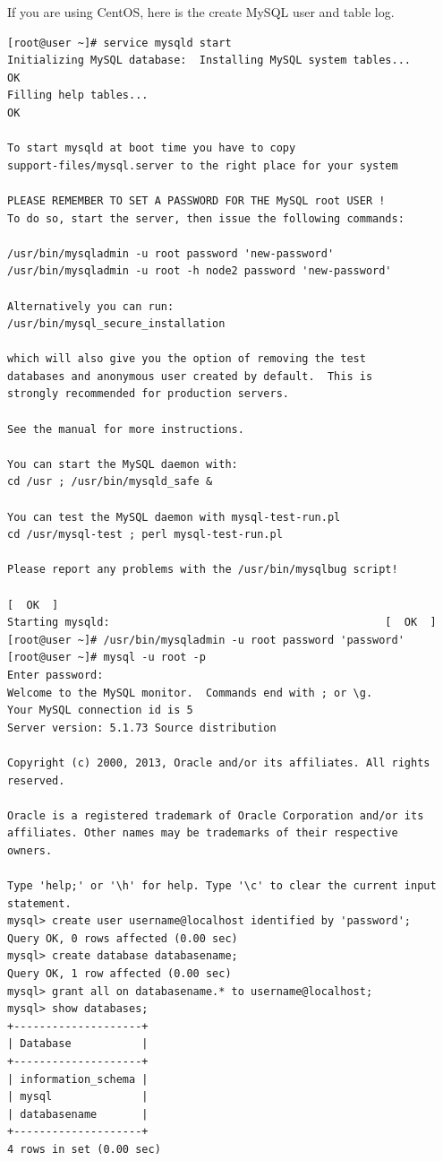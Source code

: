 \documentclass[11pt
  , a4paper
  , article
  , oneside
]{memoir}
\begin{document}
If you are using CentOS, here is the create MySQL user and table log.
\begin{lstlisting}[style=termstyle]
[root@user ~]# service mysqld start
Initializing MySQL database:  Installing MySQL system tables...
OK
Filling help tables...
OK

To start mysqld at boot time you have to copy
support-files/mysql.server to the right place for your system

PLEASE REMEMBER TO SET A PASSWORD FOR THE MySQL root USER !
To do so, start the server, then issue the following commands:

/usr/bin/mysqladmin -u root password 'new-password'
/usr/bin/mysqladmin -u root -h node2 password 'new-password'

Alternatively you can run:
/usr/bin/mysql_secure_installation

which will also give you the option of removing the test
databases and anonymous user created by default.  This is
strongly recommended for production servers.

See the manual for more instructions.

You can start the MySQL daemon with:
cd /usr ; /usr/bin/mysqld_safe &

You can test the MySQL daemon with mysql-test-run.pl
cd /usr/mysql-test ; perl mysql-test-run.pl

Please report any problems with the /usr/bin/mysqlbug script!

[  OK  ]
Starting mysqld:                                           [  OK  ]
[root@user ~]# /usr/bin/mysqladmin -u root password 'password'
[root@user ~]# mysql -u root -p
Enter password: 
Welcome to the MySQL monitor.  Commands end with ; or \g.
Your MySQL connection id is 5
Server version: 5.1.73 Source distribution

Copyright (c) 2000, 2013, Oracle and/or its affiliates. All rights reserved.

Oracle is a registered trademark of Oracle Corporation and/or its
affiliates. Other names may be trademarks of their respective
owners.

Type 'help;' or '\h' for help. Type '\c' to clear the current input statement.
mysql> create user username@localhost identified by 'password';
Query OK, 0 rows affected (0.00 sec)
mysql> create database databasename;
Query OK, 1 row affected (0.00 sec)
mysql> grant all on databasename.* to username@localhost;
mysql> show databases;
+--------------------+
| Database           |
+--------------------+
| information_schema |
| mysql              |
| databasename       |
+--------------------+
4 rows in set (0.00 sec)
\end{lstlisting}
\end{document}
